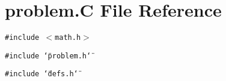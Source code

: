 \section{problem.C File Reference}
\label{problem_8C}
{\tt \#include $<$math.h$>$}\par
{\tt \#include \char`\"{}problem.h\char`\"{}}\par
{\tt \#include \char`\"{}defs.h\char`\"{}}\par
